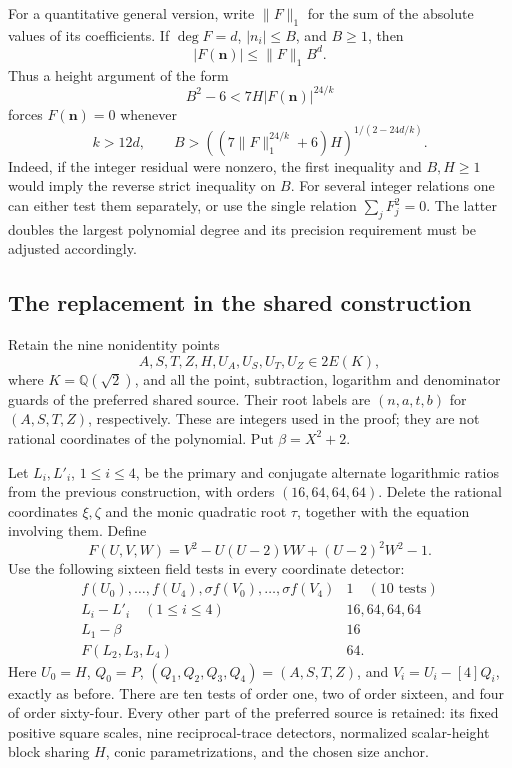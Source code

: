 For a quantitative general version, write
$\|F\|_1$ for the sum of the absolute values of its coefficients.
If $\deg F=d$, $|n_i|\le B$, and $B\ge1$, then
\[
                    |F(\mathbf n)|\le\|F\|_1B^d.
\]
Thus a height argument of the form
\[
 B^2-6<7H|F(\mathbf n)|^{24/k}
\]
forces $F(\mathbf n)=0$ whenever
\[
 k>12d,\qquad
 B>\left((7\|F\|_1^{24/k}+6)H\right)^{1/(2-24d/k)}.
\]
Indeed, if the integer residual were nonzero, the first inequality
and $B,H\ge1$ would imply the reverse strict inequality on $B$.
For several integer relations one can either test them separately,
or use the single relation $\sum_jF_j^2=0$.  The latter doubles
the largest polynomial degree and its precision requirement must
be adjusted accordingly.

\subsection{The replacement in the shared construction}

Retain the nine nonidentity points
\[
              A,S,T,Z,H,U_A,U_S,U_T,U_Z\in2E(K),
\]
where $K=\mathbb Q(\sqrt2)$, and all the point, subtraction,
logarithm and denominator guards of the preferred shared source.
Their root labels are $(n,a,t,b)$ for $(A,S,T,Z)$, respectively.
These are integers used in the proof; they are not rational
coordinates of the polynomial.  Put $\beta=X^2+2$.

Let $L_i,L'_i$, $1\le i\le4$, be the primary and conjugate
alternate logarithmic ratios from the previous construction,
with orders $(16,64,64,64)$.  Delete the rational coordinates
$\xi,\zeta$ and the monic quadratic root $\tau$, together with
the equation involving them.  Define
\[
 F(U,V,W)=V^2-U(U-2)VW+(U-2)^2W^2-1.
\]
Use the following sixteen field tests in every coordinate detector:
\[
\begin{array}{c|c}
 f(U_0),\ldots,f(U_4),\sigma f(V_0),\ldots,\sigma f(V_4)
       &1\quad(10\text{ tests})\\
 L_i-L'_i\quad(1\le i\le4)&16,64,64,64\\
 L_1-\beta&16\\
 F(L_2,L_3,L_4)&64.
\end{array}
\]
Here $U_0=H$, $Q_0=P$, $(Q_1,Q_2,Q_3,Q_4)=(A,S,T,Z)$,
and $V_i=U_i-[4]Q_i$, exactly as before.  There are ten tests
of order one, two of order sixteen, and four of order sixty-four.
Every other part of the preferred source is retained: its fixed
positive square scales, nine reciprocal-trace detectors, normalized
scalar-height block sharing $H$, conic parametrizations, and the
chosen size anchor.

